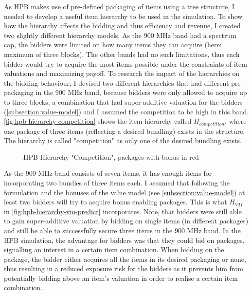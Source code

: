As HPB makes use of pre-defined packaging of items using a tree structure, I needed to develop a useful item hierarchy to be used in the simulation. To show how the hierarchy affects the bidding and thus efficiency and revenue, I created two slightly different hierarchy models. As the 900 MHz band had a spectrum cap, the bidders were limited on how many items they can acquire (here: maximum of three blocks). The other bands had no such limitations, thus each bidder would try to acquire the most items possible under the constraints of item valuations and maximizing payoff. To research the impact of the hierarchies on the bidding behaviour, I devised two different hierarchies that had different pre-packaging in the 900 MHz band, because bidders were only allowed to acquire up to three blocks, a combination that had super-additive valuation for the bidders (\autoref{subsection:value-model}) and I assumed the competition to be high in this band. \autoref{fig:hpb-hierarchy-competition} shows the item hierarchy called $ H_{competition} $, where one package of three items (reflecting a desired bundling) exists in the structure. The hierarchy is called "competition" as only one of the desired bundling exists. 

\begin{figure}[]
	\centering
	
	
	\caption{HPB Hierarchy "Competition", packages with bonus in red}
	\label{fig:hpb-hierarchy-competition}
\end{figure}

As the 900 MHz band consists of seven items, it has enough items for incorporating two bundles of three items each. I assumed that following the formulation and the bonuses of the value model (see \autoref{subsection:value-model}) at least two bidders will try to acquire bonus enabling packages. This is what $ H_{VM} $ in \autoref{fig:hpb-hierarchy-vm-predict} incorporates. 
Note, that bidders were still able to gain super-additive valuation by bidding on single items (in different packages) and still be able to successfully secure three items in the 900 MHz band. In the HPB simulation, the advantage for bidders was that they could bid on packages, signalling an interest in a certain item combination. When bidding on the package, the bidder either acquires all the items in its desired packaging or none, thus resulting in a reduced exposure risk for the bidders as it prevents him from potentially bidding above an item's valuation in order to realise a certain item combination.

